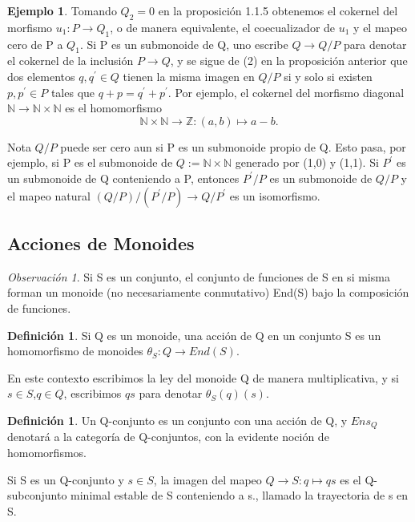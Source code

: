 \documentclass[12pt,spanish]{amsart}
\newcommand{\bb}[1]{\mathbb{#1}}
\theoremstyle{definition}
\newtheorem{Def}[Theorem]{Definición}
\newtheorem{exa}[Theorem]{Ejemplo}
\theoremstyle{remark}
\newtheorem{obs}[Theorem]{Observación}
\begin{document}
\begin{exa}
Tomando $Q_{2}=0$ en la proposición 1.1.5 obtenemos el cokernel del morfismo $u_{1}:P \to Q_{1}$, o de manera equivalente, el coecualizador de $u_{1}$ y el mapeo cero de P a $Q_{1}$. Si P es un submonoide de Q, uno escribe $Q \to Q/P$ para denotar el cokernel de la inclusión $P \to Q$, y se sigue de (2) en la proposición anterior que dos elementos $q,q^{\prime}\in Q$ tienen la misma imagen en $Q/P$ si y solo si existen $p,p^{\prime}\in P$ tales que $q+p=q^{\prime}+p^{\prime}$. Por ejemplo, el cokernel del morfismo diagonal $\bb{N} \to \bb{N}\times \bb{N}$ es el homomorfismo 
$$\bb{N}\times \bb{N} \to \bb{Z}:(a,b) \mapsto a-b.$$
\end{exa}

Nota $Q/P$ puede ser cero aun si P es un submonoide propio de Q. Esto pasa, por ejemplo, si P es el submonoide de $Q:=\mathbb{N} \times \mathbb{N}$ generado por (1,0) y (1,1). Si $P^{\prime}$ es un submonoide de Q conteniendo a P, entonces $P^{\prime}/P$ es un submonoide de $Q/P$ y el mapeo natural $(Q/P)/(P^{\prime}/P) \to Q/P^{\prime}$ es un isomorfismo. \\




\subsection{Acciones de Monoides} 
\begin{obs}
Si S es un conjunto, el conjunto de funciones de S en si misma forman un monoide (no necesariamente conmutativo) End(S) bajo la composición de funciones.
\end{obs}

\begin{Def}
Si Q es un monoide, una acción de Q en un conjunto S es un homomorfismo de monoides $\theta_{S}:Q \to End(S)$.
\end{Def}

En este contexto escribimos la ley del monoide Q de manera multiplicativa, y si $s\in S$,$q\in Q$, escribimos $qs$ para denotar $\theta_{S}(q)(s)$.

\begin{Def}
Un Q-conjunto es un conjunto con una acción de Q, y $Ens_{Q}$ denotará a la categoría de Q-conjuntos, con la evidente noción de homomorfismos.
\end{Def}

Si S es un Q-conjunto y $s\in S$, la imagen del mapeo $Q\to S:q \mapsto qs$ es el Q-subconjunto minimal estable de S conteniendo a s., llamado la trayectoria de s en S. \\
\end{document}
